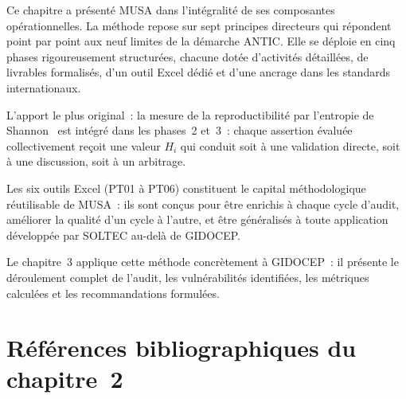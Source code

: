 \documentclass[12pt,a4paper,oneside]{report}
\begin{document}
Ce chapitre a pr\'esent\'e MUSA dans l'int\'egralit\'e de ses composantes
op\'erationnelles. La m\'ethode repose sur sept principes directeurs qui
r\'epondent point par point aux neuf limites de la d\'emarche ANTIC. Elle
se d\'eploie en cinq phases rigoureusement structur\'ees, chacune dot\'ee
d'activit\'es d\'etaill\'ees, de livrables formalis\'es, d'un outil Excel
d\'edi\'e et d'une ancrage dans les standards internationaux.

L'apport le plus original~: la mesure de la reproductibilit\'e par l'entropie
de Shannon~ est int\'egr\'e dans les phases~2 et~3~: chaque assertion
\'evalu\'ee collectivement re\c{c}oit une valeur $H_i$ qui conduit soit \`a
une validation directe, soit \`a une discussion, soit \`a un arbitrage.

Les six outils Excel (PT01 \`a PT06) constituent le capital m\'ethodologique
r\'eutilisable de MUSA~: ils sont con\c{c}us pour \^etre enrichis \`a chaque
cycle d'audit, am\'eliorer la qualit\'e d'un cycle \`a l'autre, et \^etre
g\'en\'eralis\'es \`a toute application d\'evelopp\'ee par SOLTEC au-del\`a
de GIDOCEP.

Le chapitre~3 applique cette m\'ethode concr\`etement \`a GIDOCEP~: il pr\'esente
le d\'eroulement complet de l'audit, les vuln\'erabilit\'es identifi\'ees,
les m\'etriques calcul\'ees et les recommandations formul\'ees.

\section*{R\'ef\'erences bibliographiques du chapitre~2}
\end{document}
